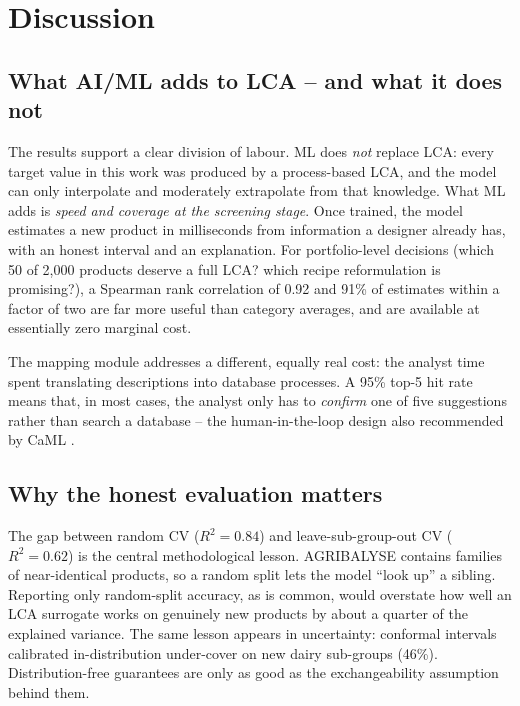 \chapter{Discussion}
\label{ch:discussion}

\section{What AI/ML adds to LCA -- and what it does not}

The results support a clear division of labour. ML does \emph{not} replace LCA: every target value
in this work was produced by a process-based LCA, and the model can only interpolate and moderately
extrapolate from that knowledge. What ML adds is \emph{speed and coverage at the screening stage}.
Once trained, the model estimates a new product in milliseconds from information a designer already
has, with an honest interval and an explanation. For portfolio-level decisions (which 50 of 2{,}000
products deserve a full LCA? which recipe reformulation is promising?), a Spearman rank correlation
of 0.92 and 91\% of estimates within a factor of two are far more useful than category averages,
and are available at essentially zero marginal cost.

The mapping module addresses a different, equally real cost: the analyst time spent translating
descriptions into database processes. A 95\% top-5 hit rate means that, in most cases, the analyst
only has to \emph{confirm} one of five suggestions rather than search a database -- the
human-in-the-loop design also recommended by CaML \citep{balaji2023caml}.

\section{Why the honest evaluation matters}

The gap between random CV ($R^2=0.84$) and leave-sub-group-out CV ($R^2=0.62$) is the central
methodological lesson. AGRIBALYSE contains families of near-identical products, so a random split
lets the model ``look up'' a sibling. Reporting only random-split accuracy, as is common, would
overstate how well an LCA surrogate works on genuinely new products by about a quarter of the
explained variance. The same lesson appears in uncertainty: conformal intervals calibrated
in-distribution under-cover on new dairy sub-groups (46\%). Distribution-free guarantees are only
as good as the exchangeability assumption behind them.

